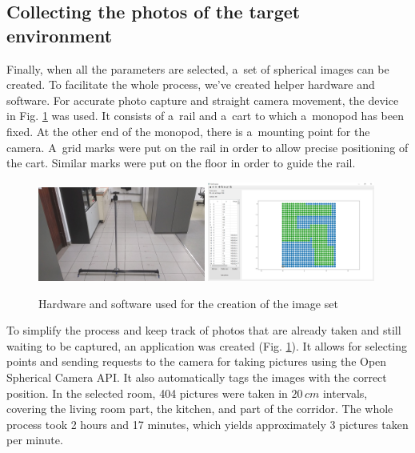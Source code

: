 \documentclass{svproc}
\begin{document}
\subsection{Collecting the photos of the target environment}

Finally, when all the parameters are selected, a~set of spherical images can be created.
To facilitate the whole process, we've created helper hardware and software.
For accurate photo capture and straight camera movement, the device in Fig. \ref{fig:rig} was used.
It consists of a~rail and a~cart to which a~monopod has been fixed.
At the other end of the monopod, there is a~mounting point for the camera.
A~grid marks were put on the rail in order to allow precise positioning of the cart.
Similar marks were put on the floor in order to guide the rail.


\begin{figure}[!ht]
    \centering
    \includegraphics[width=0.49\textwidth]{img/rig/calosc.jpg}\hfill%
    \includegraphics[width=0.49\textwidth]{img/creator.png}\\
    \caption{Hardware and software used for the creation of the image set}
    \label{fig:rig}
\end{figure}

To simplify the process and keep track of photos that are already taken and still waiting to 
be captured, an application was created (Fig. \ref{fig:rig}).
It allows for selecting points and sending requests to the camera for taking pictures using the
Open Spherical Camera API. It also automatically tags the images with the correct position.
In the selected room, 404 pictures were taken in $20\,cm$ intervals, covering the living room part,
the kitchen, and part of the corridor. The whole process took 2 hours and 17 minutes,
which yields approximately 3 pictures taken per minute. 
\end{document}
